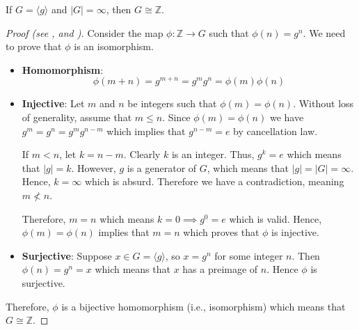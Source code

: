 \begin{theorem}
    If $G = \langle g \rangle$ and $|G| = \infty$, then $G \cong \mathbb{Z}$.
\end{theorem}
\begin{proof}[Proof (see \cite{proofwiki_infinitecyclicgrp}, and {\cite[\S 3.4 Theorem 1]{cohn_1982}})]
    Consider the map $\phi: \mathbb{Z} \to G$ such that $\phi(n) = g^n$. We need to prove that $\phi$ is an isomorphism.
    \begin{itemize}
        \item \textbf{Homomorphism}:
        \[
            \phi(m+n) = g^{m+n} = g^mg^n = \phi(m)\phi(n)
        \]
        \item \textbf{Injective}: Let $m$ and $n$ be integers such that $\phi(m) = \phi(n)$. Without loss of generality, assume that $m \leq n$. Since $\phi(m) = \phi(n)$ we have $g^m = g^n = g^mg^{n-m}$ which implies that $g^{n-m} = e$ by cancellation law.

        If $m < n$, let $k = n - m$. Clearly $k$ is an integer. Thus, $g^k = e$ which means that $|g| = k$. However, $g$ is a generator of $G$, which means that $|g| = |G| = \infty$. Hence, $k = \infty$ which is absurd. Therefore we have a contradiction, meaning $m \not< n$.

        Therefore, $m = n$ which means $k = 0 \implies g^0 = e$ which is valid. Hence, $\phi(m) = \phi(n)$ implies that $m = n$ which proves that $\phi$ is injective.
        \item \textbf{Surjective}: Suppose $x \in G = \langle g\rangle$, so $x = g^n$ for some integer $n$. Then $\phi(n) = g^n = x$ which means that $x$ has a preimage of $n$. Hence $\phi$ is surjective.
    \end{itemize}

    Therefore, $\phi$ is a bijective homomorphism (i.e., isomorphism) which means that $G \cong \mathbb{Z}$.
\end{proof}

\newpage

